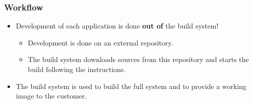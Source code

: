\begin{frame}
  \frametitle{Workflow}
  \begin{itemize}
    \item Development of each application is done
          \textbf{out of} the build system!
      \begin{itemize}
        \item Development is done on an external repository.
        \item The build system downloads sources from this repository
              and starts the build following the instructions.
      \end{itemize}
    \item The build system is used to build the full system and 
          to provide a working image to the customer.
  \end{itemize}
\end{frame}
